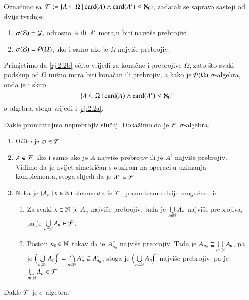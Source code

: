 \begin{rj}[\ref{zad:2.2}]
    Ozna\v cimo sa $\mathcal{F} := \{{A \subseteq \Omega} \: | \: {\textnormal{card}({A}) \land \textnormal{card}({A^c}) \leq \aleph_0}\}$,
    zadatak se zapravo sastoji od dvije tvrdnje:
    \begin{enumerate}[label=(\arabic*)]
        \item \label{rj:2.2a}
        $\sigma({\mathcal{E}}) = \mathcal{G}$, odnosno $A$ ili $A^c$ moraju biti najvi\v se prebrojivi.
        \item   \label{rj:2.2b}
        $\sigma({\mathcal{E}}) = \mathcal{P}({\Omega})$, ako i samo ako je $\Omega$ najvi\v se prebrojiv.
    \end{enumerate}
    Primjetimo da \ref{rj:2.2b} o\v cito vrijedi za kona\v cne i prebrojive $\Omega$, zato \v sto svaki podskup od $\Omega$ nu\v zno mora biti kona\v can ili prebrojiv, a kako je $\mathcal{P}({\Omega})$ $\sigma$-algebra, onda je i skup
    \begin{equation*}
        \{{A \subseteq \Omega} \: | \: {\textnormal{card}({A}) \land \textnormal{card}({A^c}) \leq \aleph_0}\}
    \end{equation*}
    $\sigma$-algebra, stoga vrijedi i \ref{rj:2.2a}.

    Dakle promatrajmo neprebrojiv slu\v caj.
    Doka\v zimo da je $\mathcal{F}$ $\sigma$-algebra.
    \begin{enumerate}[label=(\roman*)]
        \item O\v cito je $\varnothing \in \mathcal{F}$
        \item $A \in \mathcal{F}$ ako i samo ako je $A$ najvi\v se prebrojiv ili je $A^c$ najvi\v se prebrojiv.
        Vidimo da je uvijet simetri\v can s obzirom na operaciju uzimanja komplementa, stoga slijedi da je $A^c \in \mathcal{F}$
        \item Neka je $({A_n} \: | \: {n \in \mathbb{N}})$ elemenata iz $\mathcal{F}$, promatramo dvije mogu\' cnosti:
        \begin{enumerate}[label=\arabic*$\degree$)]
            \item Za svaki $n \in \mathbb{N}$ je $A_n$ najvi\v se prebrojiv, tada je $\bigcup\limits_{n \in \mathbb{N}}^{} A_n$ najvi\v se prebrojiva, pa je $\bigcup\limits_{n \in \mathbb{N}}^{} A_n \in \mathcal{F}$.
            \item Postoji $n_0 \in \mathbb{N}$ takav da je $A_{n_0}^c$ najvi\v se prebrojiv.
            Tada je $A_{n_0} \subseteq \bigcup\limits_{n \in \mathbb{N}}^{} A_n$, pa je $\Big( \bigcup\limits_{n \in \mathbb{N}}^{} A_n \Big)^c = \bigcap\limits_{n \in \mathbb{N}}^{} A_n^c \subseteq A_{n_0}^c$, stoga je $\Big( \bigcup\limits_{n \in \mathbb{N}}^{} A_n \Big)^c$ najvi\v se prebrojiv, pa je $\bigcup\limits_{n \in \mathbb{N}}^{} A_n \in \mathcal{F}$
        \end{enumerate}
    \end{enumerate}
    Dakle $\mathcal{F}$ je $\sigma$-algebra.


\end{rj}
